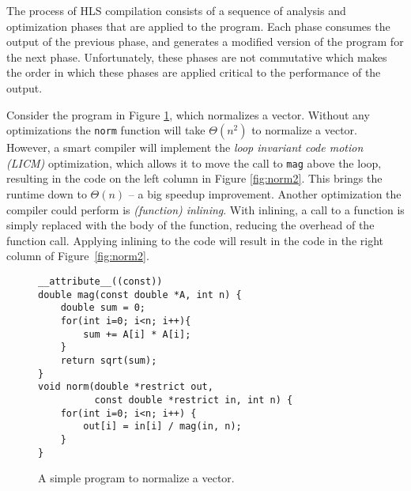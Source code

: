 The process of HLS compilation consists of a sequence of analysis and optimization phases that are applied to the program. 
Each phase consumes the output of the previous phase, and generates a modified version of the program for the next phase. Unfortunately, these phases are not commutative which makes the order in which these phases are applied critical to the performance of the output.  


Consider the program in Figure \ref{fig:norm1}, which normalizes a vector. Without any optimizations the \verb|norm| function will take $\Theta(n^2)$ to normalize a vector. However, a smart compiler will implement the \textit{loop invariant code motion (LICM)}\cite[Sec.~13.2]{Muchnick97} optimization, which allows it to move the call to \verb|mag| above the loop, resulting in the code on the left column in Figure \ref{fig:norm2}. This brings the runtime down to $\Theta(n)$ -- a big speedup improvement. Another optimization the compiler could perform is \textit{(function) inlining}\cite[Sec.~15.2]{Muchnick97}. With inlining, a call to a function is simply replaced with the body of the function, reducing the overhead of the function call. Applying inlining to the code 
will result in the code in the right column of Figure~\ref{fig:norm2}.
\begin{figure}[h]
     \centering
         \centering
\begin{verbatim}
__attribute__((const))
double mag(const double *A, int n) {
    double sum = 0;
    for(int i=0; i<n; i++){
        sum += A[i] * A[i];
    }
    return sqrt(sum);
}
void norm(double *restrict out,
          const double *restrict in, int n) {
    for(int i=0; i<n; i++) {
        out[i] = in[i] / mag(in, n);
    }
}
\end{verbatim}
\vspace*{-0.2cm}
\caption{A simple program to normalize a vector. \vspace*{-0.1cm}}
    \label{fig:norm1}
\end{figure}
